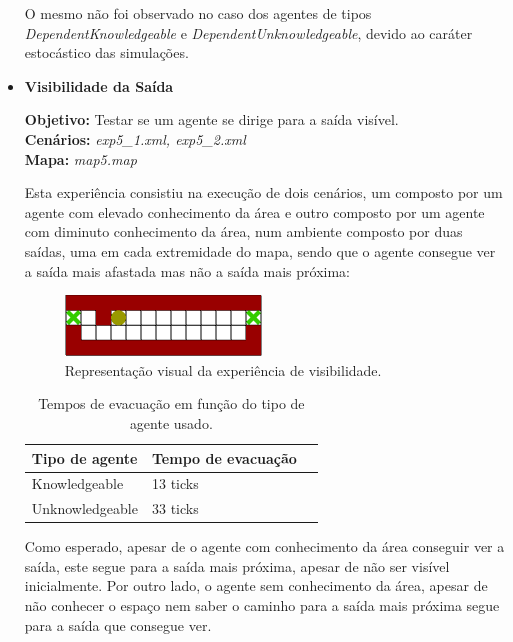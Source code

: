 \documentclass[12pt]{article}
\begin{document}
\begin{titlepage}
\begin{itemize}
	O mesmo não foi observado no caso dos agentes de tipos \textit{DependentKnowledgeable} e \textit{DependentUnknowledgeable}, devido ao caráter estocástico das simulações.


	\item \textbf{Visibilidade da Saída}

	\textbf{Objetivo:} 
                                                                                                                                  	Testar se um agente se dirige para a saída visível.
\\\textbf{Cenários:} 
\textit{exp5\_1.xml, exp5\_2.xml}
\\\textbf{Mapa:} 
\textit{map5.map}

Esta experiência consistiu na execução de dois cenários, um composto por um agente com elevado conhecimento da área e outro composto por um agente com diminuto conhecimento da área, num ambiente composto por duas saídas, uma em cada extremidade do mapa, sendo que o agente consegue ver a saída mais afastada mas não a saída mais próxima:

\begin{figure}[H]
	\centering
	\includegraphics[scale=1]{map5.png}
	\caption{Representação visual da experiência de visibilidade.}
	\label{map}
\end{figure}


\setlength{\tabcolsep}{20pt}
\renewcommand{\arraystretch}{1.3}
\begin{table}[H]
	\centering
	\caption{Tempos de evacuação em função do tipo de agente usado.}
	\begin{tabular}{@{}lll@{}}
		\toprule
		\rowcolor[HTML]{FFFFFF} 
		\textbf{Tipo de agente}  & \textbf{Tempo de evacuação}\\
		\toprule
		\rowcolor[HTML]{FFFFFF} 
		Knowledgeable & 13 ticks \\ \midrule 
		\rowcolor[HTML]{FFFFFF} Unknowledgeable &
		33 ticks \\ \midrule 
	\end{tabular}
\end{table}

Como esperado, apesar de o agente com conhecimento da área conseguir ver a saída, este segue para a saída mais próxima, apesar de não ser visível inicialmente. Por outro lado, o agente sem conhecimento da área, apesar de não conhecer o espaço nem saber o caminho para a saída mais próxima segue para a saída que consegue ver.


\end{itemize}
\end{titlepage}
\end{document}
